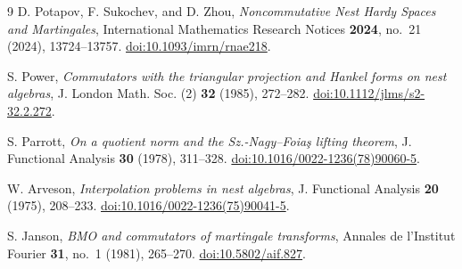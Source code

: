 \documentclass[UTF8,11pt,a4paper,fontset=fandol]{ctexart}
\theoremstyle{remark}
\numberwithin{equation}{section}
\begin{document}
\begin{thebibliography}{9}
D. Potapov, F. Sukochev, and D. Zhou,
\emph{Noncommutative Nest Hardy Spaces and Martingales},
International Mathematics Research Notices \textbf{2024}, no.~21 (2024), 13724--13757.
\href{https://doi.org/10.1093/imrn/rnae218}{doi:10.1093/imrn/rnae218}.

S. Power,
\emph{Commutators with the triangular projection and Hankel forms on nest algebras},
J. London Math. Soc. (2) \textbf{32} (1985), 272--282.
\href{https://doi.org/10.1112/jlms/s2-32.2.272}{doi:10.1112/jlms/s2-32.2.272}.

S. Parrott,
\emph{On a quotient norm and the Sz.-Nagy--Foia\c{s} lifting theorem},
J. Functional Analysis \textbf{30} (1978), 311--328.
\href{https://doi.org/10.1016/0022-1236(78)90060-5}{doi:10.1016/0022-1236(78)90060-5}.

W. Arveson,
\emph{Interpolation problems in nest algebras},
J. Functional Analysis \textbf{20} (1975), 208--233.
\href{https://doi.org/10.1016/0022-1236(75)90041-5}{doi:10.1016/0022-1236(75)90041-5}.

S. Janson,
\emph{BMO and commutators of martingale transforms},
Annales de l'Institut Fourier \textbf{31}, no.~1 (1981), 265--270.
\href{https://doi.org/10.5802/aif.827}{doi:10.5802/aif.827}.

\end{thebibliography}
\end{document}
